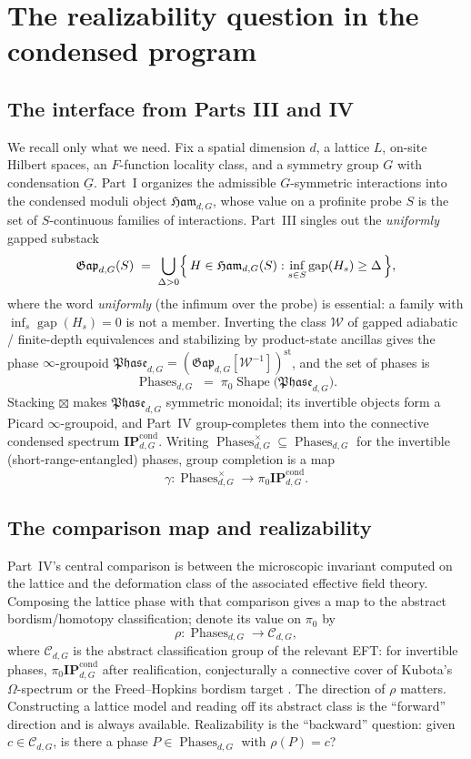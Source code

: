 \documentclass[12pt]{article}
\newcommand{\cg}[1]{\underline{#1}}            %
\newcommand{\Shape}{\operatorname{Shape}}      %
\newcommand{\Ham}{\mathfrak{Ham}}              %
\newcommand{\Gap}{\mathfrak{Gap}}              %
\newcommand{\Phase}{\mathfrak{Phase}}          %
\newcommand{\Phases}{\operatorname{Phases}}    %
\newcommand{\Weq}{\mathcal{W}}                 %
\newcommand{\st}{\mathrm{st}}                  %
\newcommand{\gapof}[1]{\operatorname{gap}(#1)} %
\newcommand{\gapbound}{\Delta}                  %
\newcommand{\IPcond}{\mathbf{IP}^{\mathrm{cond}}}  %
\newcommand{\real}{\rho}                         %
\theoremstyle{definition}
\theoremstyle{remark}
\begin{document}
\section{The realizability question in the condensed program}
\label{sec:framework}

\subsection{The interface from Parts III and IV}

We recall only what we need. Fix a spatial dimension $d$, a lattice $L$, on-site Hilbert
spaces, an $F$-function locality class, and a symmetry group $G$ with condensation $\cg{G}$.
Part~I organizes the admissible $G$-symmetric interactions into the condensed moduli object
$\Ham_{d,G}$, whose value on a profinite probe $S$ is the set of $S$-continuous families of
interactions. Part~III singles out the \emph{uniformly} gapped substack
\[
  \Gap_{d,G}(S) \;=\; \bigcup_{\gapbound>0}\Bigl\{\,H\in\Ham_{d,G}(S) : \inf_{s\in S}\gapof{H_s}\ge\gapbound \,\Bigr\},
\]
where the word \emph{uniformly} (the infimum over the probe) is essential: a family
with $\inf_s\gapof{H_s}=0$ is not a member. Inverting the class $\Weq$ of gapped adiabatic /
finite-depth equivalences \cite{bmns-automorphic} and stabilizing by product-state ancillas gives the phase
$\infty$-groupoid $\Phase_{d,G}=(\Gap_{d,G}[\Weq^{-1}])^{\st}$, and the set of phases is
\[
  \Phases_{d,G} \;=\; \pi_0\Shape\bigl(\Phase_{d,G}\bigr).
\]
Stacking $\boxtimes$ makes $\Phase_{d,G}$ symmetric monoidal; its invertible objects form a
Picard $\infty$-groupoid, and Part~IV group-completes them into the connective condensed
spectrum $\IPcond_{d,G}$. Writing $\Phases^{\times}_{d,G}\subseteq\Phases_{d,G}$ for the
invertible (short-range-entangled) phases, group completion is a map
\[
  \gamma \colon \Phases^{\times}_{d,G} \longrightarrow \pi_0\IPcond_{d,G}.
\]

\subsection{The comparison map and realizability}

Part~IV's central comparison is between the microscopic invariant computed on the lattice
and the deformation class of the associated effective field theory. Composing the lattice
phase with that comparison gives a map to the abstract bordism/homotopy classification;
denote its value on $\pi_0$ by
\[
  \real \colon \Phases_{d,G} \longrightarrow \mathcal{C}_{d,G},
\]
where $\mathcal{C}_{d,G}$ is the abstract classification group of the relevant EFT: for
invertible phases, $\pi_0\IPcond_{d,G}$ after realification, conjecturally a connective cover
of Kubota's $\Omega$-spectrum \cite{kubota-omega-spectrum} or the Freed--Hopkins bordism
target \cite{freed-hopkins}. The direction of $\real$ matters. Constructing a lattice model
and reading off its abstract class is the ``forward'' direction and is always available.
Realizability is the ``backward'' question: given $c\in\mathcal{C}_{d,G}$, is there a phase
$P\in\Phases_{d,G}$ with $\real(P)=c$?
\end{document}

